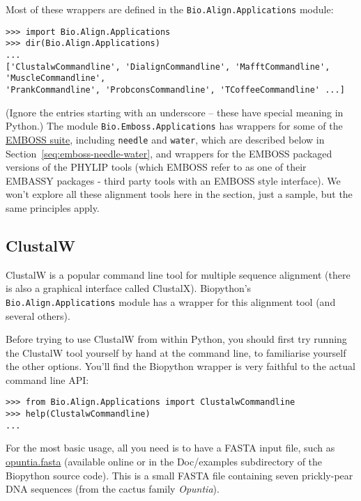 \documentclass{report}
\begin{document}
Most of these wrappers are defined in the \verb|Bio.Align.Applications| module:

\begin{verbatim}
>>> import Bio.Align.Applications
>>> dir(Bio.Align.Applications)
...
['ClustalwCommandline', 'DialignCommandline', 'MafftCommandline', 'MuscleCommandline',
'PrankCommandline', 'ProbconsCommandline', 'TCoffeeCommandline' ...]
\end{verbatim}

\noindent (Ignore the entries starting with an underscore -- these have
special meaning in Python.)
The module \verb|Bio.Emboss.Applications| has wrappers for some of the
\href{http://emboss.sourceforge.net/}{EMBOSS suite}, including
\texttt{needle} and \texttt{water}, which are described below in
Section~\ref{seq:emboss-needle-water}, and wrappers for the EMBOSS
packaged versions of the PHYLIP tools (which EMBOSS refer to as one
of their EMBASSY packages - third party tools with an EMBOSS style
interface).
We won't explore all these alignment tools here in the section, just a
sample, but the same principles apply.

\subsection{ClustalW}
\label{sec:align_clustal}
ClustalW is a popular command line tool for multiple sequence alignment
(there is also a graphical interface called ClustalX). Biopython's
\verb|Bio.Align.Applications| module has a wrapper for this alignment tool
(and several others).

Before trying to use ClustalW from within Python, you should first try running
the ClustalW tool yourself by hand at the command line, to familiarise
yourself the other options. You'll find the Biopython wrapper is very
faithful to the actual command line API:

\begin{verbatim}
>>> from Bio.Align.Applications import ClustalwCommandline
>>> help(ClustalwCommandline)
...
\end{verbatim}

For the most basic usage, all you need is to have a FASTA input file, such as
\href{http://biopython.org/DIST/docs/tutorial/examples/opuntia.fasta}{opuntia.fasta}
(available online or in the Doc/examples subdirectory of the Biopython source
code). This is a small FASTA file containing seven prickly-pear DNA sequences
(from the cactus family \textit{Opuntia}).
\end{document}
